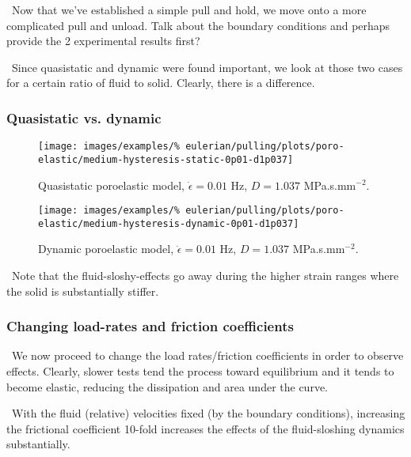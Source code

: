 \textbullet\ Now that we've established a simple pull and hold, we
move onto a more complicated pull and unload. Talk about the boundary
conditions and perhaps provide the 2 experimental results first?

\textbullet\ Since quasistatic and dynamic were found important, we
look at those two cases for a certain ratio of fluid to
solid. Clearly, there is a difference.

\subsubsection{Quasistatic vs. dynamic}
\label{quasistatic-vs-dynamic}

\begin{figure}[!hptb]
\centering
\texttt{[image: images/examples/\%
eulerian/pulling/plots/poro-elastic/medium-hysteresis-static-0p01-d1p037]}
\caption{Quasistatic poroelastic model, $\dot{\epsilon}=0.01$ Hz, $D=1.037$
  MPa.s.mm$^{-2}$.}
\label{medium-hysteresis-static-0p01-d1p037}
\end{figure}

\begin{figure}[!hptb]
\centering
\texttt{[image: images/examples/\%
eulerian/pulling/plots/poro-elastic/medium-hysteresis-dynamic-0p01-d1p037]}
\caption{Dynamic poroelastic model, $\dot{\epsilon}=0.01$ Hz, $D=1.037$
  MPa.s.mm$^{-2}$.}
\label{medium-hysteresis-dynamic-0p01-d1p037}
\end{figure}

\textbullet\ Note that the fluid-sloshy-effects go away during the
higher strain ranges where the solid is substantially stiffer.

\subsubsection{Changing load-rates and friction coefficients}
\label{load-rates-and-friction-coefficients}

\textbullet\ We now proceed to change the load rates/friction
coefficients in order to observe effects. Clearly, slower tests tend
the process toward equilibrium and it tends to become elastic,
reducing the dissipation and area under the curve.

\textbullet\ With the fluid (relative) velocities fixed (by the
boundary conditions), increasing
the frictional coefficient 10-fold increases the effects of the
fluid-sloshing dynamics substantially.

